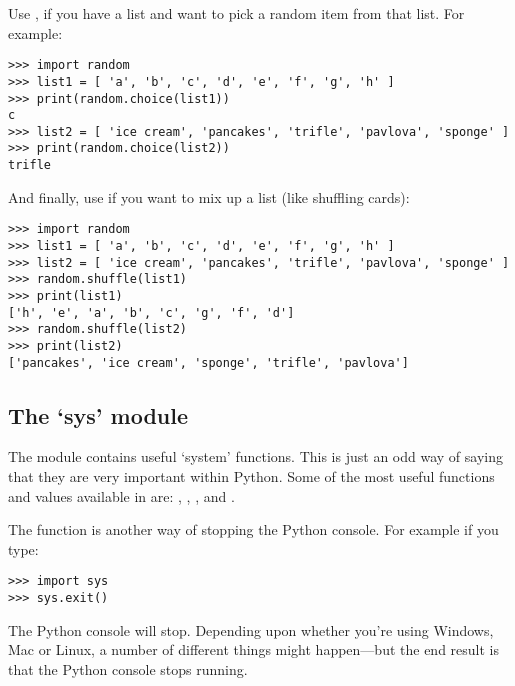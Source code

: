 Use ,  if you have a list and want to pick a random item from that list. For example:

\begin{listingignore}
\begin{verbatim}
>>> import random
>>> list1 = [ 'a', 'b', 'c', 'd', 'e', 'f', 'g', 'h' ]
>>> print(random.choice(list1))
c
>>> list2 = [ 'ice cream', 'pancakes', 'trifle', 'pavlova', 'sponge' ]
>>> print(random.choice(list2))
trifle
\end{verbatim}
\end{listingignore}

And finally, use  if you want to mix up a list (like shuffling cards):

\begin{listingignore}
\begin{verbatim}
>>> import random
>>> list1 = [ 'a', 'b', 'c', 'd', 'e', 'f', 'g', 'h' ]
>>> list2 = [ 'ice cream', 'pancakes', 'trifle', 'pavlova', 'sponge' ]
>>> random.shuffle(list1)
>>> print(list1)
['h', 'e', 'a', 'b', 'c', 'g', 'f', 'd']
>>> random.shuffle(list2)
>>> print(list2)
['pancakes', 'ice cream', 'sponge', 'trifle', 'pavlova']
\end{verbatim}
\end{listingignore}

\subsection*{The `sys' module}

The  module contains useful `system' functions. This is just an odd way of saying that they are very important within Python. Some of the most useful functions and values available in  are: , , , and .
\par
The  function is another way of stopping the Python console. For example if you type:

\begin{listingignore}
\begin{verbatim}
>>> import sys
>>> sys.exit()
\end{verbatim}
\end{listingignore}

The Python console will stop. Depending upon whether you're using Windows, Mac or Linux, a number of different things might happen---but the end result is that the Python console stops running.

